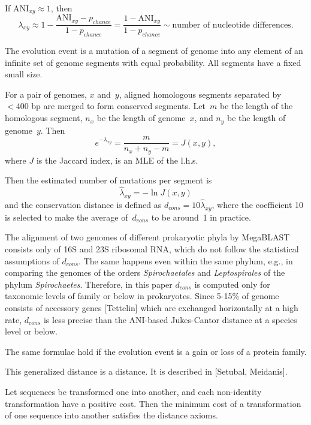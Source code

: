 \documentclass[10pt,a4paper]{article}
\begin{document}
If $\mathrm{ANI}_{xy} \approx 1$, then
$$ \lambda_{xy} \approx 1 - \frac {\mathrm{ANI}_{xy} - p_{chance}} {1 - p_{chance}} = \frac {1 - \mathrm{ANI}_{xy}}  {1 - p_{chance}}
  \sim \textrm{number of nucleotide differences}.
$$



The evolution event is a mutation of a segment of genome into any element of an infinite set of genome segments with equal probability.
All segments have a fixed small size.

For a pair of genomes, $x$ and~$y$, aligned homologous segments separated by $< 400$ bp are merged to form conserved segments.
Let~$m$ be the length of the homologous segment,
$n_x$ be the length of genome~$x$, and
$n_y$ be the length of genome~$y$.
Then
$$ e^{-\lambda_{xy}} = \frac m {n_x + n_y - m} = J(x,y),$$
where $J$ is the Jaccard index,
is an MLE of the l.h.s.

Then the estimated number of mutations per segment is
$$ \hat \lambda_{xy} = - \ln J(x,y) $$
and the conservation distance is defined as
$ d_{cons} = 10 \hat \lambda_{xy}$,
where the coefficient 10 is selected to make the average of~$d_{cons}$ to be around~1 in practice.

The alignment of two genomes of different prokaryotic phyla by MegaBLAST consists only of 16S and 23S ribosomal RNA,
which do not follow the statistical assumptions of $d_{cons}$.
The same happens even within the same phylum,
e.g., in comparing the genomes of the orders {\it Spirochaetales} and {\it Leptospirales} of the phylum {\it Spirochaetes}.
Therefore, in this paper $d_{cons}$ is computed only for taxonomic levels of family or below in prokaryotes.
Since 5-15\% of genome consists of accessory genes [Tettelin] which are exchanged horizontally at a high rate, $d_{cons}$ is less precise than the ANI-based Jukes-Cantor distance at a species level or below.

The same formulae hold if the evolution event is a gain or loss of a protein family.




This generalized distance is a distance.
It is described in [Setubal, Meidanis].

Let sequences be transformed one into another, and each non-identity transformation have a positive cost.
Then the minimum cost of a transformation of one sequence into another satisfies the distance axioms.
\end{document}
